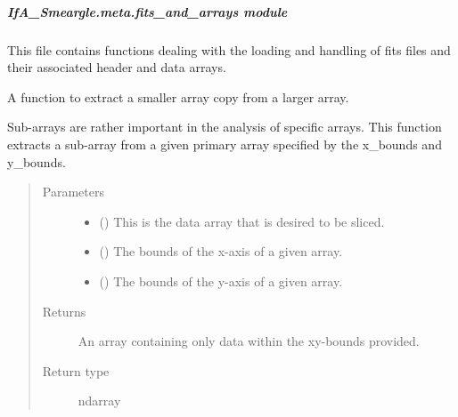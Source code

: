 \documentclass[letterpaper,10pt,english]{sphinxmanual}
\begin{document}
\subparagraph{IfA\_Smeargle.meta.fits\_and\_arrays module}
\label{\detokenize{python_docstrings/IfA_Smeargle.meta.fits_and_arrays:module-IfA_Smeargle.meta.fits_and_arrays}}\label{\detokenize{python_docstrings/IfA_Smeargle.meta.fits_and_arrays:ifa-smeargle-meta-fits-and-arrays-module}}\label{\detokenize{python_docstrings/IfA_Smeargle.meta.fits_and_arrays::doc}}
This file contains functions dealing with the loading and handling of fits files and their
associated header and data arrays.

\begin{fulllineitems}
\label{\detokenize{python_docstrings/IfA_Smeargle.meta.fits_and_arrays:IfA_Smeargle.meta.fits_and_arrays.smeargle_extract_subarray}}
A function to extract a smaller array copy from a larger array.

Sub-arrays are rather important in the analysis of specific arrays.
This function extracts a sub-array from a given primary array specified
by the x\_bounds and y\_bounds.
\begin{quote}\begin{description}
\item[{Parameters}] \leavevmode\begin{itemize}
\item {} 
 () \textendash{} This is the data array that is desired to be sliced.

\item {} 
 () \textendash{} The bounds of the x-axis of a given array.

\item {} 
 () \textendash{} The bounds of the y-axis of a given array.

\end{itemize}

\item[{Returns}] \leavevmode
{} \textendash{} An array containing only data within the xy-bounds provided.

\item[{Return type}] \leavevmode
ndarray

\end{description}\end{quote}

\end{fulllineitems}
\end{document}
